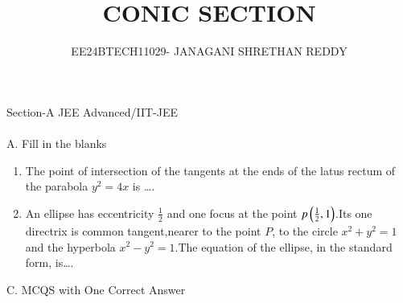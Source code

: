 \documentclass[journal,12pt,twocolumn]{IEEEtran}
\theoremstyle{remark}
\begin{document}
 


\vspace{3cm}

\title{CONIC SECTION}
\author{EE24BTECH11029- JANAGANI SHRETHAN REDDY}
\maketitle
\newpage
\bigskip
\renewcommand{\thefigure}{\theenumi}
\renewcommand{\thetable}{\theenumi}

{Section-A JEE Advanced/IIT-JEE}
\\\\{A. Fill in the blanks}
\begin{enumerate}
    \item The point of intersection of the tangents at the ends of the latus rectum of the parabola $y^2=4x$ is \dots.
    \hfill{}\\
    \item An ellipse has eccentricity $\frac{1}{2}$ and one focus at the point $p\left(\frac{1}{2},1\right)$.Its one directrix is common tangent,nearer to the point $P$, to the circle $x^2+y^2=1$ and the hyperbola $x^2-y^2=1$.The equation of the ellipse, in the standard form, is\dots. \\
\end{enumerate}
{C. MCQS with One Correct Answer} 
\end{document}
